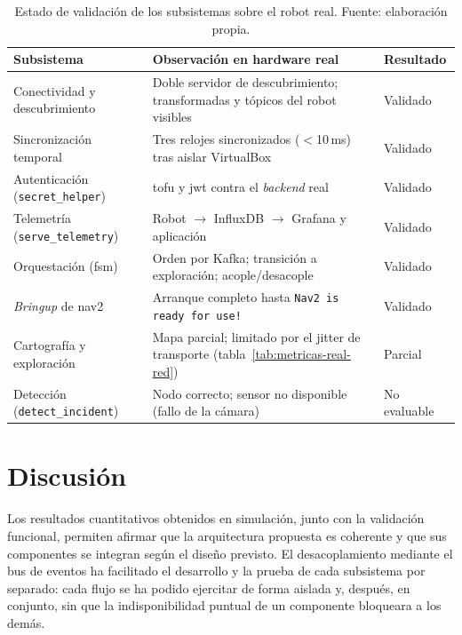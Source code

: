 \begin{table}[htbp]
  \centering
  \small
  \caption{Estado de validación de los subsistemas sobre el robot real. Fuente: elaboración
    propia.}
  \label{tab:validacion-real}
  \begin{tabular}{@{}>{\raggedright\arraybackslash}p{4.6cm}
                     >{\raggedright\arraybackslash}p{6.0cm}
                     >{\raggedright\arraybackslash}p{2.6cm}@{}}
    \toprule
    \textbf{Subsistema} & \textbf{Observación en hardware real} & \textbf{Resultado} \\
    \midrule
    Conectividad y descubrimiento & Doble servidor de descubrimiento; transformadas y tópicos
    del robot visibles & Validado \\
    \addlinespace[3pt]
    Sincronización temporal & Tres relojes sincronizados ($<$10\,ms) tras aislar VirtualBox &
    Validado \\
    \addlinespace[3pt]
    Autenticación (\texttt{secret\_helper}) & \gls{tofu} y \gls{jwt} contra el \emph{backend}
    real & Validado \\
    \addlinespace[3pt]
    Telemetría (\texttt{serve\_telemetry}) & Robot $\rightarrow$ InfluxDB $\rightarrow$ Grafana
    y aplicación & Validado \\
    \addlinespace[3pt]
    Orquestación (\gls{fsm}) & Orden por Kafka; transición a exploración; acople/desacople &
    Validado \\
    \addlinespace[3pt]
    \emph{Bringup} de \gls{nav2} & Arranque completo hasta \texttt{Nav2 is ready for use!} &
    Validado \\
    \addlinespace[3pt]
    Cartografía y exploración & Mapa parcial; limitado por el jitter de transporte
    (tabla~\ref{tab:metricas-real-red}) & Parcial \\
    \addlinespace[3pt]
    Detección (\texttt{detect\_incident}) & Nodo correcto; sensor no disponible (fallo
    de la cámara) & No evaluable \\
    \bottomrule
  \end{tabular}
\end{table}

\section{Discusión}
\label{sec:discusion}

Los resultados cuantitativos obtenidos en simulación, junto con la validación funcional,
permiten afirmar que la arquitectura propuesta es coherente y que sus componentes se integran
según el diseño previsto. El desacoplamiento mediante el bus de eventos ha facilitado el
desarrollo y la prueba de cada subsistema por separado: cada flujo se ha podido ejercitar de
forma aislada y, después, en conjunto, sin que la indisponibilidad puntual de un componente
bloqueara a los demás.

